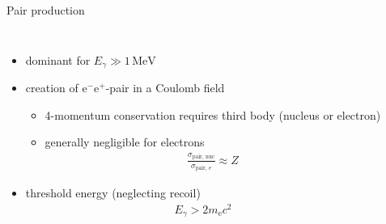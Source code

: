 \documentclass[11pt,xcolor=dvipsnames,professionalfonts,notes]{beamer}
\begin{document}
\begin{frame}{Pair production}
\begin{columns}
	\begin{itemize}
		\setlength\itemsep{1.5em}
		\item dominant for $E_\gamma \gg 1 \, \mathrm{MeV}$
		
		\item creation of $\mathrm{e}^- \mathrm{e}^+$-pair in a Coulomb field
		\begin{itemize}
			\item 4-momentum conservation requires third body (nucleus or electron)
			\item generally negligible for electrons
			\begin{align*}
				\frac{\sigma_\mathrm{pair,\, nuc}}{\sigma_\mathrm{pair,\, e}} \approx Z
			\end{align*}
		\end{itemize}
		
		\item threshold energy (neglecting recoil)
		\begin{align*}
			E_\gamma > 2 m_\mathrm{e}c^2
		\end{align*}
		
		
	\end{itemize}
	

\end{columns}
\end{frame}
\end{document}
